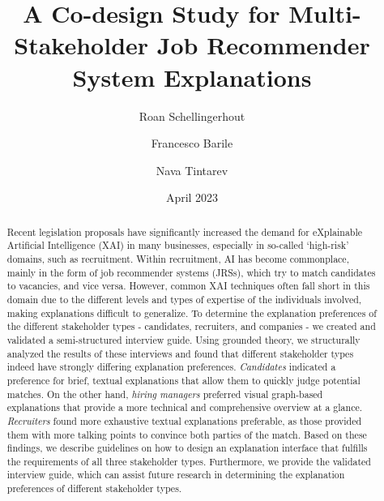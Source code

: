 \documentclass[runningheads]{llncs}
\begin{document}
\title{A Co-design Study for Multi-Stakeholder Job Recommender System Explanations}



\author{Roan Schellingerhout \and Francesco Barile \and Nava Tintarev}

\date{April 2023}






\maketitle

\begin{abstract}
    Recent legislation proposals have significantly increased the demand for eXplainable Artificial Intelligence (XAI) in many businesses, especially in so-called `high-risk' domains, such as recruitment. Within recruitment, AI has become commonplace, mainly in the form of job recommender systems (JRSs), which try to match candidates to vacancies, and vice versa. However, common XAI techniques often fall short in this domain due to the different levels and types of expertise of the individuals involved, making explanations difficult to generalize. To determine the explanation preferences of the different stakeholder types - candidates, recruiters, and companies - we created and validated a semi-structured interview guide. Using grounded theory, we structurally analyzed the results of these interviews and found that different stakeholder types indeed have strongly differing explanation preferences. \textit{Candidates} indicated a preference for brief, textual explanations that allow them to quickly judge potential matches. On the other hand, \textit{hiring managers} preferred visual graph-based explanations that provide a more technical and comprehensive overview at a glance. \textit{Recruiters} found more exhaustive textual explanations preferable, as those provided them with more talking points to convince both parties of the match. Based on these findings, we describe guidelines on how to design an explanation interface that fulfills the requirements of all three stakeholder types. Furthermore, we provide the validated interview guide, which can assist future research in determining the explanation preferences of different stakeholder types. 
\end{abstract}









% 



\end{document}
